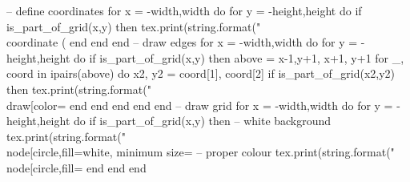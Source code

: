 \begin{luacode}
-- define coordinates
for x = -width,width do
	for y = -height,height do
		if is_part_of_grid(x,y) then
			tex.print(string.format("\\coordinate (%
		end
	end 
end 
-- draw edges
for x = -width,width do
	for y = -height,height do
		if is_part_of_grid(x,y) then
			above = {{x-1,y+1}, {x+1, y+1}}
			for _, coord in ipairs(above) do 
				x2, y2 = coord[1], coord[2]
				if is_part_of_grid(x2,y2) then
					tex.print(string.format("\\draw[color=%
				end
			end
		end
	end 
end 
-- draw grid
for x = -width,width do
	for y = -height,height do
		if is_part_of_grid(x,y) then
			-- white background
			tex.print(string.format("\\node[circle,fill=white, minimum size=%
			-- proper colour
			tex.print(string.format("\\node[circle,fill=%
		end
	end 
end 

\end{luacode}